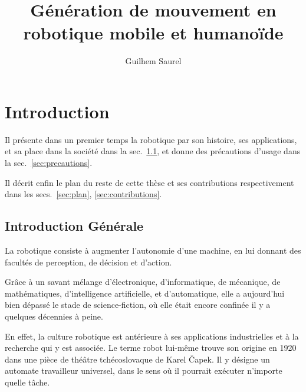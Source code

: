 \documentclass[french,A4paper,]{book}
\title{Génération de mouvement en robotique mobile et humanoïde}
\author{Guilhem Saurel}
\institute{LAAS-CNRS}
\date{}
\renewcommand*\listfigurename{List of Figures}
\renewcommand*\listtablename{List of Tables}
\begin{document}
\makeflyleaf

{
\setcounter{tocdepth}{2}
\tableofcontents
}

\renewcommand{\listtablename}{Liste des Tables}
\renewcommand{\listfigurename}{Liste des Figures}
\renewcommand{\listalgorithmname}{Liste des Algorithmes}

\listoftables
\listoffigures
\listofalgorithms
\renewcommand{\thechapter}{\Alph{chapter}}
\renewcommand{\theequation}{\Alph{chapter}-\arabic{equation}}

\makeatletter
\renewcommand{\ALG@name}{Algorithme} \makeatother
\algnewcommand{}
\algnewcommand{}

\newcommand{\vectwo}[2]{\ensuremath{\left(\begin{array}{c}{#1} \\ {#2}\end{array}\right)}}

\fancyhead{} \fancyfoot{} \fancyhead[LE]{\thepage}
\fancyhead[RO]{\thepage} \fancyhead[RE]{\leftmark}
\fancyhead[LO]{\rightmark}

\chapter{Introduction}\label{introduction}

Il présente dans un premier temps la robotique par son histoire, ses
applications, et sa place dans la société dans la sec.~\ref{sec:intgen},
et donne des précautions d'usage dans la sec.~\ref{sec:precautions}.

Il décrit enfin le plan du reste de cette thèse et ses contributions
respectivement dans les secs.~\ref{sec:plan}, \ref{sec:contributions}.

\section{Introduction Générale}\label{sec:intgen}

La robotique consiste à augmenter l'autonomie d'une machine, en lui
donnant des facultés de perception, de décision et d'action.

Grâce à un savant mélange d'électronique, d'informatique, de mécanique,
de mathématiques, d'intelligence artificielle, et d'automatique, elle a
aujourd'hui bien dépassé le stade de science-fiction, où elle était
encore confinée il y a quelques décennies à peine.

En effet, la culture robotique est antérieure à ses applications
industrielles et à la recherche qui y est associée. Le terme robot
lui-même trouve son origine en 1920 dans une pièce de théâtre
tchécoslovaque de Karel Čapek. Il y désigne un automate travailleur
universel, dans le sens où il pourrait exécuter n'importe quelle tâche.
\end{document}
